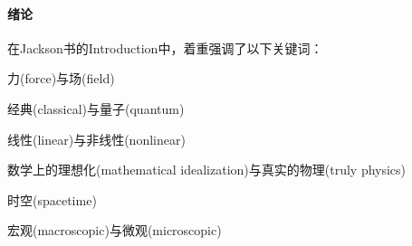 \paragraph{绪论}

在Jackson书的Introduction中，着重强调了以下关键词：
\begin{compactitem}
	\item 力(force)与场(field)
	\item 经典(classical)与量子(quantum)
	\item 线性(linear)与非线性(nonlinear)
	\item 数学上的理想化(mathematical idealization)与真实的物理(truly physics)
	\item 时空(spacetime)
	\item 宏观(macroscopic)与微观(microscopic)
\end{compactitem}

